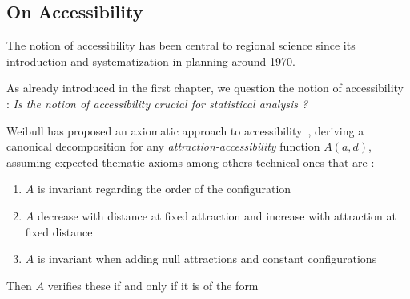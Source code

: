 


\subsection{On Accessibility}


The notion of accessibility has been central to regional science since its introduction and systematization in planning around 1970. 





As already introduced in the first chapter, we question the notion of accessibility : \textit{Is the notion of accessibility crucial for statistical analysis ?}

\medskip


Weibull has proposed an axiomatic approach to accessibility~\cite{weibull1976axiomatic}, deriving a canonical decomposition for any \emph{attraction-accessibility} function $A(a,d)$, assuming expected thematic axioms among others technical ones that are :
\begin{enumerate}
\item $A$ is invariant regarding the order of the configuration
\item $A$ decrease with distance at fixed attraction and increase with attraction at fixed distance
\item $A$ is invariant when adding null attractions and constant configurations
\end{enumerate}
Then $A$ verifies these if and only if it is of the form

